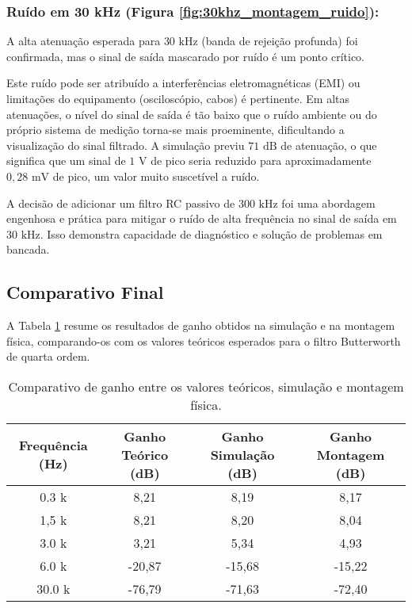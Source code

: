 \subsubsection{Ruído em 30 kHz (Figura \ref{fig:30khz_montagem_ruido}):}
A alta atenuação esperada para $30 \text{ kHz}$ (banda de rejeição profunda) foi confirmada, mas o sinal de saída mascarado por ruído é um ponto crítico.

Este ruído pode ser atribuído a interferências eletromagnéticas (EMI) ou limitações do equipamento (osciloscópio, cabos) é pertinente. Em altas atenuações, o nível do sinal de saída é tão baixo que o ruído ambiente ou do próprio sistema de medição torna-se mais proeminente, dificultando a visualização do sinal filtrado. A simulação previu $71 \text{ dB}$ de atenuação, o que significa que um sinal de $1 \text{ V}$ de pico seria reduzido para aproximadamente $0,28 \text{ mV}$ de pico, um valor muito suscetível a ruído.

A decisão de adicionar um filtro RC passivo de $300 \text{ kHz}$ foi uma abordagem engenhosa e prática para mitigar o ruído de alta frequência no sinal de saída em $30 \text{ kHz}$. Isso demonstra capacidade de diagnóstico e solução de problemas em bancada.

\subsection{Comparativo Final}

A Tabela \ref{tab:comparativo_resultados} resume os resultados de ganho obtidos na simulação e na montagem física, comparando-os com os valores teóricos esperados para o filtro Butterworth de quarta ordem.

\begin{table}[H]
\centering
\begin{tabular}{|c|c|c|c|}
\hline
\textbf{Frequência (Hz)} & \textbf{Ganho Teórico (dB)} & \textbf{Ganho Simulação (dB)} & \textbf{Ganho Montagem (dB)} \\
\hline
0.3 k & 8,21 & 8,19 & 8,17 \\ \hline
1,5 k & 8,21 & 8,20 & 8,04 \\ \hline
3.0 k & 3,21 & 5,34 & 4,93 \\ \hline
6.0 k & -20,87 & -15,68 & -15,22 \\ \hline
30.0 k & -76,79 & -71,63 & -72,40 \\ \hline
\end{tabular}
\caption{Comparativo de ganho entre os valores teóricos, simulação e montagem física.}
\label{tab:comparativo_resultados}
\end{table}

